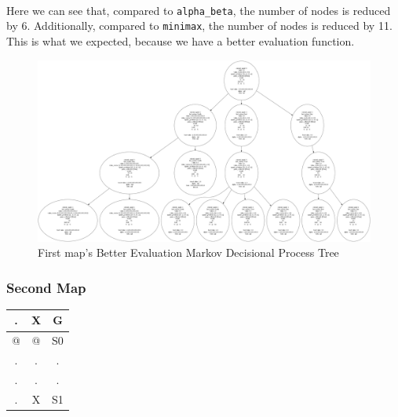 \documentclass{article}
\begin{document}
    
\paragraph{}
Here we can see that, compared to \texttt{alpha\_beta}, 
the number of nodes is reduced by 6. 
Additionally, compared to \texttt{minimax}, 
the number of nodes is reduced by 11. 
This is what we expected, because we have a better evaluation function.

\begin{figure}[h]
    \centering
    \includegraphics[width=\textwidth]{media/20231029-134819.png}
    \caption{First map's Better Evaluation Markov Decisional Process Tree}
    \label{fig:image1tree}
\end{figure}
\vspace{1em}


\newpage
\newpage
\subsubsection{Second Map}

\begin{table}[h]
    \centering
    \begin{tabular}{|c|c|c|}
    \hline
    . & X & G \\
    \hline
    @ & @ & S0 \\
    \hline
    . & . & . \\
    \hline
    . & . & . \\
    \hline
    . & X & S1 \\
    \hline
    \end{tabular}
    \label{tab:grid}
    \end{table}
    
\end{document}
